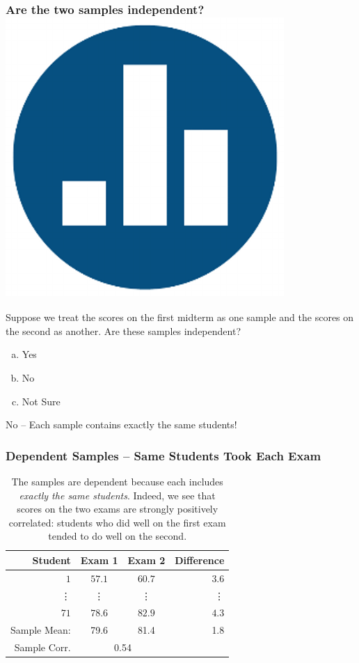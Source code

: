 \documentclass[handout]{beamer}
\begin{document}
\begin{frame}
\frametitle{Are the two samples independent? \hfill \includegraphics[scale = 0.05]{./images/clicker}}
Suppose we treat the scores on the first midterm as one sample and the scores on the second as another. Are these samples independent?

\begin{enumerate}[(a)]
	\item Yes
	\item No
	\item Not Sure
\end{enumerate}

\pause
\alert{No -- Each sample contains exactly the same students!}

\end{frame}
\begin{frame}
\frametitle{Dependent Samples -- Same Students Took Each Exam}
%
\begin{table}[!tbp]
\begin{center}
\begin{tabular}{rccr}
\hline\hline
\multicolumn{1}{r}{Student}&\multicolumn{1}{c}{Exam 1}&\multicolumn{1}{c}{Exam 2}&\multicolumn{1}{r}{Difference}\tabularnewline
\hline
$ 1$&$57.1$&$60.7$&$  3.6$\tabularnewline
\vdots&\vdots&\vdots&\vdots\\
$71$&$78.6$&$82.9$&$  4.3$\tabularnewline
\hline
Sample Mean: & 79.6 & 81.4  &1.8\\
\alert{Sample Corr.} & \multicolumn{2}{c}{\alert{0.54}}&\\
\hline
\end{tabular}
\caption{The samples are dependent because each includes \emph{exactly the same students}. Indeed, we see that scores on the two exams are strongly positively correlated: students who did well on the first exam tended to do well on the second.}
\end{center}
\end{table}

\end{frame}
\end{document}
